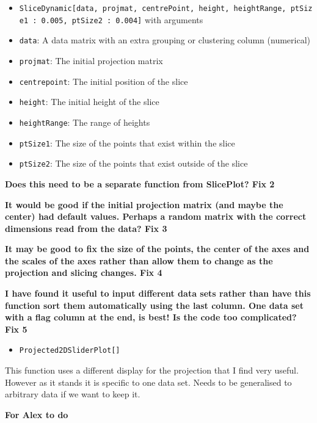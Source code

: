 \documentclass[]{interact}
\theoremstyle{plain}%
\theoremstyle{definition}
\theoremstyle{remark}
\providecommand{\tightlist}{%
  \setlength{\itemsep}{0pt}\setlength{\parskip}{0pt}}
\def\tightlist{}
\begin{document}
\begin{itemize}
\item
  \texttt{SliceDynamic{[}data,\ projmat,\ centrePoint,\ height,\ heightRange,\ ptSize1\ :\ 0.005,\ ptSize2\ :\ 0.004{]}}
  with arguments
\item
  \texttt{data}: A data matrix with an extra grouping or clustering
  column (numerical)
\item
  \texttt{projmat}: The initial projection matrix
\item
  \texttt{centrepoint}: The initial position of the slice
\item
  \texttt{height}: The initial height of the slice
\item
  \texttt{heightRange}: The range of heights
\item
  \texttt{ptSize1}: The size of the points that exist within the slice
\item
  \texttt{ptSize2}: The size of the points that exist outside of the
  slice
\end{itemize}

\textbf{Does this need to be a separate function from SlicePlot? Fix 2}

\textbf{It would be good if the initial projection matrix (and maybe the
center) had default values. Perhaps a random matrix with the correct
dimensions read from the data? Fix 3}

\textbf{It may be good to fix the size of the points, the center of the
axes and the scales of the axes rather than allow them to change as the
projection and slicing changes. Fix 4}

\textbf{I have found it useful to input different data sets rather than
have this function sort them automatically using the last column. One
data set with a flag column at the end, is best! Is the code too
complicated? Fix 5}

\begin{itemize}
\tightlist
\item
  \texttt{Projected2DSliderPlot{[}{]}}
\end{itemize}

This function uses a different display for the projection that I find
very useful. However as it stands it is specific to one data set. Needs
to be generalised to arbitrary data if we want to keep it.

\textbf{For Alex to do}
\end{document}
